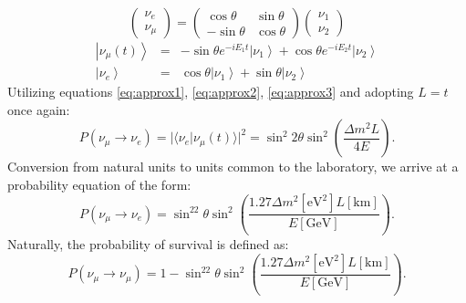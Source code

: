 \documentclass[aps,prd,twocolumn,nofootinbib]{revtex4-1}
\begin{document}
\begin{equation}
  \begin{pmatrix}
    \nu_e \\
    \nu_{\mu}
  \end{pmatrix} = \begin{pmatrix}
    \cos\theta & \sin\theta \\
    -\sin\theta & \cos\theta
  \end{pmatrix}
  \begin{pmatrix}
    \nu_1 \\
    \nu_2
  \end{pmatrix}
\end{equation}
\begin{eqnarray}
  \left|\nu_{\mu}(t)\right\rangle &=& -\sin\theta e^{-iE_1t}\left|\nu_1\right\rangle+\cos\theta e^{-iE_2t}\left|\nu_2\right\rangle \\
  \left|\nu_e\right\rangle &=& \cos\theta\left|\nu_1\right\rangle+\sin\theta\left|\nu_2\right\rangle
\end{eqnarray}
Utilizing equations \ref{eq:approx1}, \ref{eq:approx2}, \ref{eq:approx3} and adopting $L=t$ once again:
\begin{equation}
  P(\nu_{\mu}\rightarrow\nu_e) = |\langle \nu_e | \nu_{\mu}(t)\rangle|^2 = \sin^2 2\theta \sin^2\left(\frac{\Delta m^2 L}{4E}\right).
\end{equation}
Conversion from natural units to units common to the laboratory, we arrive at a probability equation of the form:
\begin{equation}
  P(\nu_{\mu}\rightarrow\nu_e) = \sin^22\theta\sin^2\left(\frac{1.27\Delta m^2 \left[\text{eV}^2\right] L [\text{km}]}{E[\text{GeV}]}\right).
  \label{eq:osc}
\end{equation}
Naturally, the probability of survival is defined as:
\begin{equation}
  P(\nu_{\mu}\rightarrow\nu_{\mu}) = 1-\sin^22\theta\sin^2\left(\frac{1.27\Delta m^2 \left[\text{eV}^2\right] L [\text{km}]}{E[\text{GeV}]}\right).
  \label{eq:surv}
\end{equation}
\end{document}
